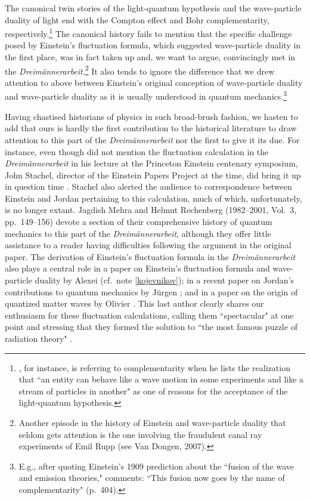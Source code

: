 \documentclass{elsart}
\begin{document}
The canonical twin stories of the light-quantum hypothesis and the wave-particle duality of light end with the Compton effect and Bohr complementarity, respectively.\footnote{\citet[p.\ 237]{Brush 2007}, for instance, is referring to complementarity when he lists the realization that ``an entity can behave like a wave motion in some experiments and like a stream of particles in another" as one of reasons for the acceptance of the light-quantum hypothesis.} The canonical history fails to mention that the specific challenge posed by Einstein's fluctuation formula, which suggested wave-particle duality in the first place, was in fact taken up and, we want to argue, convincingly met in the {\it Dreim\"annerarbeit}.\footnote{Another episode in the history of Einstein and wave-particle duality that seldom gets attention is the one involving the fraudulent canal ray experiments of Emil Rupp (see Van Dongen, 2007).}  It also tends to ignore the difference that we drew attention to above between Einstein's original conception of wave-particle duality and wave-particle duality as it is usually understood in quantum mechanics.\footnote{\label{pais}E.g., after quoting Einstein's 1909 prediction about the ``fusion of the wave and emission theories," \citet{Pais 1982} comments: ``This fusion now goes by the name of complementarity" (p.\ 404).} 

Having chastised historians of physics in such broad-brush fashion, we hasten to add that ours is hardly the first contribution to the historical literature to draw attention to this part of the {\it Dreim\"annerarbeit} nor the first to give it its due. For instance, even though \citet{Klein 1980} did not mention the fluctuation calculation in the {\it Dreim\"annerarbeit} in his lecture at the Princeton Einstein centenary symposium, John Stachel, director of the Einstein Papers Project at the time, did bring it up in question time \citep[p.\ 196]{Woolf 1980}. Stachel also alerted the audience to  correspondence between Einstein and Jordan pertaining to this calculation, much of which, unfortunately, is no longer extant. Jagdish Mehra and Helmut Rechenberg (1982--2001, Vol.\ 3, pp.\ 149--156) devote a section of their comprehensive history of quantum mechanics to this part of the {\it Dreim\"annerarbeit}, although they offer little assistance to a reader having difficulties following the argument in the original paper. The derivation of Einstein's fluctuation formula in the  {\it Dreim\"annerarbeit} also plays a central role in a paper on Einstein's fluctuation formula and wave-particle duality by Alexei \citet{Kojevnikov 1990} (cf.\ note \ref{kojevnikov}); in a recent paper on Jordan's contributions to quantum mechanics by J\"urgen \citet{Ehlers 2007}; and in a paper on the origin of quantized matter waves by Olivier \citet{Darrigol 1986}. This last author clearly shares our enthusiasm for these fluctuation calculations, calling them ``spectacular" at one point and stressing that they formed the solution to ``the most famous puzzle of radiation theory" \citep[p.\ 221--222]{Darrigol 1986}. 
\end{document}
